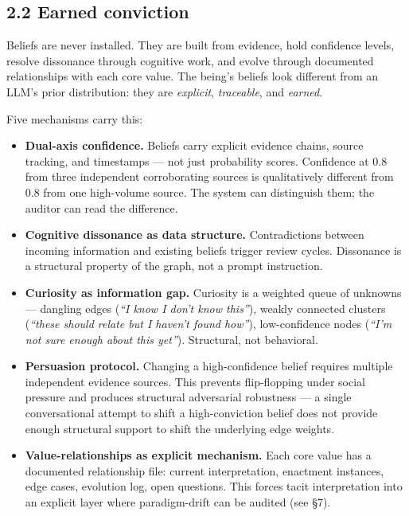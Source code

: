 \documentclass[12pt]{article}
\providecommand{\tightlist}{%
  \setlength{\itemsep}{0pt}\setlength{\parskip}{0pt}}
\begin{document}
\subsection{2.2 Earned conviction}\label{earned-conviction}

Beliefs are never installed. They are built from evidence, hold confidence levels, resolve dissonance through cognitive work, and evolve through documented relationships with each core value. The being's beliefs look different from an LLM's prior distribution: they are \emph{explicit}, \emph{traceable}, and \emph{earned}.

Five mechanisms carry this:

\begin{itemize}
\tightlist
\item
  \textbf{Dual-axis confidence.} Beliefs carry explicit evidence chains, source tracking, and timestamps --- not just probability scores. Confidence at 0.8 from three independent corroborating sources is qualitatively different from 0.8 from one high-volume source. The system can distinguish them; the auditor can read the difference.
\item
  \textbf{Cognitive dissonance as data structure.} Contradictions between incoming information and existing beliefs trigger review cycles. Dissonance is a structural property of the graph, not a prompt instruction.
\item
  \textbf{Curiosity as information gap.} Curiosity is a weighted queue of unknowns --- dangling edges (\emph{``I know I don't know this''}), weakly connected clusters (\emph{``these should relate but I haven't found how''}), low-confidence nodes (\emph{``I'm not sure enough about this yet''}). Structural, not behavioral.
\item
  \textbf{Persuasion protocol.} Changing a high-confidence belief requires multiple independent evidence sources. This prevents flip-flopping under social pressure and produces structural adversarial robustness --- a single conversational attempt to shift a high-conviction belief does not provide enough structural support to shift the underlying edge weights.
\item
  \textbf{Value-relationships as explicit mechanism.} Each core value has a documented relationship file: current interpretation, enactment instances, edge cases, evolution log, open questions. This forces tacit interpretation into an explicit layer where paradigm-drift can be audited (see §7).
\end{itemize}
\end{document}
